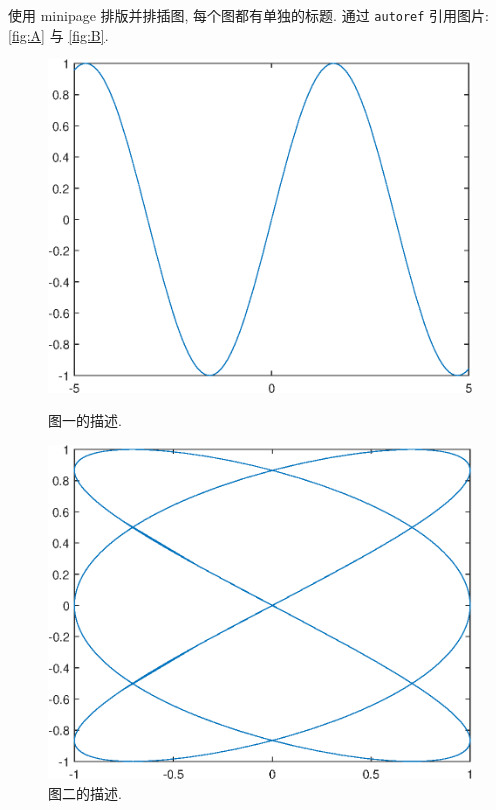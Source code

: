 \documentclass[UTF8,openany]{ctexbook}
\numberwithin{equation}{chapter}
\numberwithin{figure}{chapter}
\numberwithin{table}{chapter}
\theoremstyle{mystyle}
\begin{document}
\clearpage
使用 minipage 排版并排插图, 每个图都有单独的标题. 通过 \verb|autoref| 引用图片: \autoref{fig:A} 与 \autoref{fig:B}.
\begin{figure}[htp!]
\begin{minipage}[t]{0.48\linewidth}
  \centering
  \includegraphics[width=0.9\linewidth]{image1}
  \caption{图一的描述.}
  \label{fig:A}
\end{minipage}
\hfill
\begin{minipage}[t]{0.48\linewidth}
  \centering
  \includegraphics[width=0.9\linewidth]{image2}
  \caption{图二的描述.}
  \label{fig:B}
\end{minipage}
\end{figure}

\end{document}
